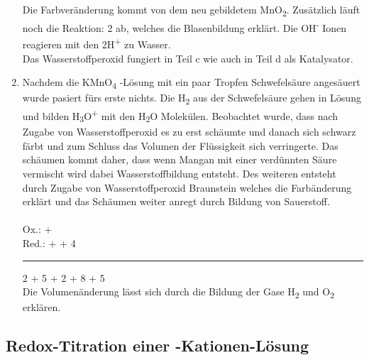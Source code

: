 \documentclass{scrartcl}
\begin{document}
\begin{enumerate}[label=\alph*)]
Die Farbveränderung kommt von dem neu gebildetem MnO\textsubscript{2}. Zusätzlich läuft noch die Reaktion: 2 ab, welches die Blasenbildung erklärt. Die OH\textsuperscript{-} Ionen reagieren mit den 2H\textsuperscript{+} zu Wasser.\\
Das Wasserstoffperoxid fungiert in Teil c wie auch in Teil d als Katalysator.
\item Nachdem die KMnO\textsubscript{4} -Lösung mit ein paar Tropfen Schwefelsäure angesäuert wurde pasiert fürs erste nichts. Die H\textsubscript{2} aus der Schwefelsäure gehen in Lösung und bilden H\textsubscript{3}O\textsuperscript{+} mit den H\textsubscript{2}O Molekülen. Beobachtet wurde, dass nach Zugabe von Wasserstoffperoxid es zu erst schäumte und danach sich schwarz färbt und zum Schluss das Volumen der Flüssigkeit sich verringerte. Das schäumen kommt daher, dass wenn Mangan mit einer verdünnten Säure vermischt wird dabei Wasserstoffbildung entsteht. Des weiteren entsteht durch Zugabe von Wasserstoffperoxid Braunstein welches die Farbänderung erklärt und das Schäumen weiter anregt durch Bildung von Sauerstoff.\\ \\
	Ox.:  \ch{<=>}  +  \\
  Red.:  +   + 4 \\ 
\noindent\rule{\textwidth}{0.4pt}
2 + 5 +  2 + 8 + 5 \\
Die Volumenänderung lässt sich durch die Bildung der Gase H\textsubscript{2} und O\textsubscript{2} erklären.
\end{enumerate}
 \subsection{Redox-Titration einer -Kationen-Lösung}
\end{document}
